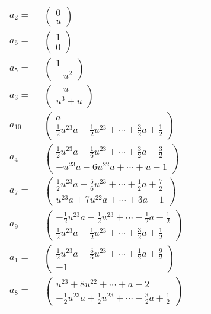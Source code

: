 \documentclass[1p]{elsarticle_modified}
\theoremstyle{definition}
\begin{document}
\begin{tabular}{m{7pt} m{180pt} m{7pt} m{180pt} }
\flushright $a_{2}=$&$\begin{pmatrix}0\\u\end{pmatrix}$ \\
\flushright $a_{6}=$&$\begin{pmatrix}1\\0\end{pmatrix}$ \\
\flushright $a_{5}=$&$\begin{pmatrix}1\\- u^2\end{pmatrix}$ \\
\flushright $a_{3}=$&$\begin{pmatrix}- u\\u^3+u\end{pmatrix}$ \\
\flushright $a_{10}=$&$\begin{pmatrix}a\\\frac{1}{2} u^{23} a+\frac{1}{2} u^{23}+\cdots+\frac{3}{2} a+\frac{1}{2}\end{pmatrix}$ \\
\flushright $a_{4}=$&$\begin{pmatrix}\frac{1}{2} u^{23} a+\frac{1}{6} u^{23}+\cdots+\frac{3}{2} a-\frac{3}{2}\\- u^{23} a-6 u^{22} a+\cdots+u-1\end{pmatrix}$ \\
\flushright $a_{7}=$&$\begin{pmatrix}\frac{1}{2} u^{23} a+\frac{5}{6} u^{23}+\cdots+\frac{1}{2} a+\frac{7}{2}\\u^{23} a+7 u^{22} a+\cdots+3 a-1\end{pmatrix}$ \\
\flushright $a_{9}=$&$\begin{pmatrix}-\frac{1}{2} u^{23} a-\frac{1}{2} u^{23}+\cdots-\frac{1}{2} a-\frac{1}{2}\\\frac{1}{2} u^{23} a+\frac{1}{2} u^{23}+\cdots+\frac{3}{2} a+\frac{1}{2}\end{pmatrix}$ \\
\flushright $a_{1}=$&$\begin{pmatrix}\frac{1}{2} u^{23} a+\frac{5}{6} u^{23}+\cdots+\frac{1}{2} a+\frac{9}{2}\\-1\end{pmatrix}$ \\
\flushright $a_{8}=$&$\begin{pmatrix}u^{23}+8 u^{22}+\cdots+a-2\\-\frac{1}{2} u^{23} a+\frac{1}{2} u^{23}+\cdots-\frac{3}{2} a+\frac{1}{2}\end{pmatrix}$ \\

\end{tabular}
\end{document}
